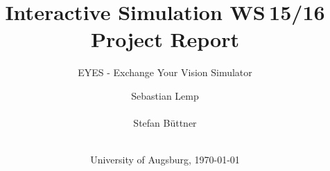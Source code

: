 \documentclass{sig-alternate-05-2015}
\begin{document}
\title{
Interactive Simulation WS 15/16\\ %
Project Report
}
\subtitle{EYES - Exchange Your Vision Simulator}
\author{
\alignauthor
Sebastian Lemp\\
       \\
\alignauthor
Stefan Büttner\\
       \\
}

\date{University of Augsburg, \today}


\end{document}
